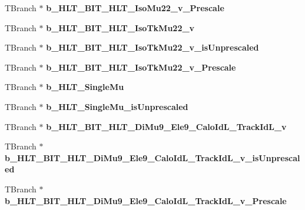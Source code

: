 \begin{DoxyCompactItemize}
\item 
\hypertarget{classMiniTree_aaf94feef803e181e802bea7c4058fc13}{}\label{classMiniTree_aaf94feef803e181e802bea7c4058fc13} 
T\+Branch $\ast$ {\bfseries b\+\_\+\+H\+L\+T\+\_\+\+B\+I\+T\+\_\+\+H\+L\+T\+\_\+\+Iso\+Mu22\+\_\+v\+\_\+\+Prescale}
\item 
\hypertarget{classMiniTree_a1db95134a41663ceadd410fd152817ad}{}\label{classMiniTree_a1db95134a41663ceadd410fd152817ad} 
T\+Branch $\ast$ {\bfseries b\+\_\+\+H\+L\+T\+\_\+\+B\+I\+T\+\_\+\+H\+L\+T\+\_\+\+Iso\+Tk\+Mu22\+\_\+v}
\item 
\hypertarget{classMiniTree_a16e008b3ecd824b5ede92ff9e3da0fda}{}\label{classMiniTree_a16e008b3ecd824b5ede92ff9e3da0fda} 
T\+Branch $\ast$ {\bfseries b\+\_\+\+H\+L\+T\+\_\+\+B\+I\+T\+\_\+\+H\+L\+T\+\_\+\+Iso\+Tk\+Mu22\+\_\+v\+\_\+is\+Unprescaled}
\item 
\hypertarget{classMiniTree_aa84f275df3dc72d2810153a42aae1727}{}\label{classMiniTree_aa84f275df3dc72d2810153a42aae1727} 
T\+Branch $\ast$ {\bfseries b\+\_\+\+H\+L\+T\+\_\+\+B\+I\+T\+\_\+\+H\+L\+T\+\_\+\+Iso\+Tk\+Mu22\+\_\+v\+\_\+\+Prescale}
\item 
\hypertarget{classMiniTree_a196f956fe94951ba2f7fec22b5346153}{}\label{classMiniTree_a196f956fe94951ba2f7fec22b5346153} 
T\+Branch $\ast$ {\bfseries b\+\_\+\+H\+L\+T\+\_\+\+Single\+Mu}
\item 
\hypertarget{classMiniTree_ae34ea8d11dfaf2f63c703a5c1c7432eb}{}\label{classMiniTree_ae34ea8d11dfaf2f63c703a5c1c7432eb} 
T\+Branch $\ast$ {\bfseries b\+\_\+\+H\+L\+T\+\_\+\+Single\+Mu\+\_\+is\+Unprescaled}
\item 
\hypertarget{classMiniTree_ad447c48c39bc0fc279d52d1437886068}{}\label{classMiniTree_ad447c48c39bc0fc279d52d1437886068} 
T\+Branch $\ast$ {\bfseries b\+\_\+\+H\+L\+T\+\_\+\+B\+I\+T\+\_\+\+H\+L\+T\+\_\+\+Di\+Mu9\+\_\+\+Ele9\+\_\+\+Calo\+Id\+L\+\_\+\+Track\+Id\+L\+\_\+v}
\item 
\hypertarget{classMiniTree_a4f2ccd7f9342df1578f7d09466952341}{}\label{classMiniTree_a4f2ccd7f9342df1578f7d09466952341} 
T\+Branch $\ast$ {\bfseries b\+\_\+\+H\+L\+T\+\_\+\+B\+I\+T\+\_\+\+H\+L\+T\+\_\+\+Di\+Mu9\+\_\+\+Ele9\+\_\+\+Calo\+Id\+L\+\_\+\+Track\+Id\+L\+\_\+v\+\_\+is\+Unprescaled}
\item 
\hypertarget{classMiniTree_a789fcd0e0ec695a306ca95f5b8d539ad}{}\label{classMiniTree_a789fcd0e0ec695a306ca95f5b8d539ad} 
T\+Branch $\ast$ {\bfseries b\+\_\+\+H\+L\+T\+\_\+\+B\+I\+T\+\_\+\+H\+L\+T\+\_\+\+Di\+Mu9\+\_\+\+Ele9\+\_\+\+Calo\+Id\+L\+\_\+\+Track\+Id\+L\+\_\+v\+\_\+\+Prescale}

\end{DoxyCompactItemize}
